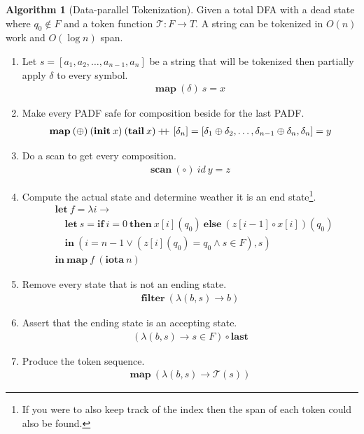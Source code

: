 \documentclass[a4paper,12pt]{article}
\theoremstyle{definition}
\newtheorem{algorithm}{Algorithm}[section]
\newcommand\doubleplus{+\kern-1.3ex+\kern0.8ex}
\begin{document}
\begin{algorithm}[Data-parallel Tokenization]\label{algo:token}
  Given a total DFA with a dead state where $q_0 \notin F$ and a token function $\mathcal{T}: F \to T$. A string can be tokenized in $O(n)$ work and $O(\log n)$ span.
  \begin{enumerate}
    \item Let $s = [a_1, a_2, \dots, a_{n - 1}, a_n]$ be a string that will be tokenized then partially apply $\delta$ to every symbol. 
    \begin{align*}
      \mathbf{map} \: (\delta) \: s = x
    \end{align*}
    \item Make every PADF safe for composition beside for the last PADF.
    \begin{align*}
      \mathbf{map} \: (\oplus) \: (\mathbf{init} \:x) \: (\mathbf{tail} \: x) \doubleplus [\delta_n] = [\delta_1 \oplus \delta_2, \dots, \delta_{n - 1} \oplus \delta_n, \delta_n] = y
    \end{align*}
    \item Do a scan to get every composition.
    \begin{align*}
      \mathbf{scan} \: (\circ) \: id \: y = z
    \end{align*}
    \item Compute the actual state and determine weather it is an end state\footnote{If you were to also keep track of the index then the span of each token could also be found.}.
    \begin{align*}
      & \mathbf{let} \: f = \lambda i \to \\
      & \quad \mathbf{let} \: s = \mathbf{if} \: i = 0 \: \mathbf{then} \: x[i](q_0) \: \mathbf{else} \: (z[i - 1] \circ x[i])(q_0) \\
      & \quad \mathbf{in} \: (i = n - 1 \lor (z[i](q_0) = q_0 \land s \in F), s) \\
      & \mathbf{in} \: \mathbf{map} \: f \: (\mathbf{iota} \: n)
    \end{align*}
    \item Remove every state that is not an ending state.
    \begin{align*}
      \mathbf{filter} \: (\lambda(b, s) \to b)
    \end{align*}
    \item Assert that the ending state is an accepting state.
    \begin{align*}
       (\lambda(b, s) \to s \in F) \circ \mathbf{last}
    \end{align*}
    \item Produce the token sequence.
    \begin{align*}
      \mathbf{map} \: (\lambda(b, s) \to \mathcal{T}(s))
    \end{align*}
  \end{enumerate}
\end{algorithm}
\end{document}
